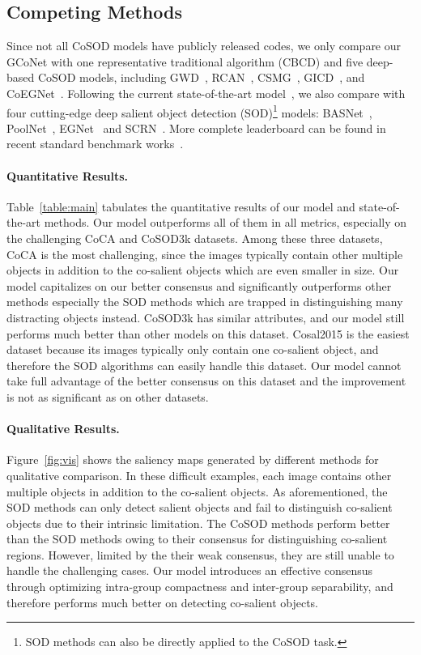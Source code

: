 \documentclass[final]{cvpr}
\def\ourmodel{GCoNet}
\begin{document}
\subsection{Competing Methods}
Since not all CoSOD models have publicly released codes, we only compare our {\ourmodel}  with one representative traditional algorithm (CBCD) and five deep-based CoSOD models, including GWD~\cite{li2019group}, RCAN~\cite{li2019detecting}, CSMG~\cite{zhang2019co}, GICD~\cite{zhang2020gradient}, and 
CoEGNet~\cite{deng2020re}. Following the current state-of-the-art model~\cite{zhang2020gradient}, we also compare with four cutting-edge deep salient object detection (SOD)\footnote{SOD methods can also be directly applied to the CoSOD task.} models: BASNet~\cite{qin2019basnet}, PoolNet~\cite{liu2019simple}, EGNet~\cite{zhao2019egnet} and SCRN~\cite{wu2019stacked}. More complete leaderboard can be found in recent standard benchmark works~\cite{deng2020re,fan2020taking}.






\paragraph{Quantitative Results.~}
Table~\ref{table:main}
tabulates the quantitative results of our model and state-of-the-art methods. Our model outperforms all of them in all metrics, especially on the challenging CoCA and CoSOD3k datasets. Among these three datasets, CoCA is the most challenging, since the images typically  contain other multiple  objects in addition to the co-salient objects which are even smaller in size. Our model capitalizes on our better consensus  
and significantly outperforms other methods especially  the SOD methods which are trapped in distinguishing many distracting objects instead. 
CoSOD3k has similar attributes, and our model still performs much better than other models on this dataset. Cosal2015 is the easiest dataset because its images typically only contain one co-salient object, and therefore the SOD algorithms can easily handle this dataset. Our model cannot take full advantage of the better consensus on this dataset and the improvement is not as significant as on other datasets.

\paragraph{Qualitative Results.~} Figure~\ref{fig:vis} shows the saliency maps generated by different methods for qualitative comparison. In these difficult examples, each image contains other multiple objects in addition to the co-salient objects. As aforementioned, the SOD methods can only detect  salient objects and fail to distinguish co-salient objects due to their intrinsic limitation. The CoSOD methods perform better than the SOD methods owing to their consensus for distinguishing co-salient regions. However, limited by the their weak consensus, they are still unable to  handle the challenging cases. Our model introduces an effective consensus  through optimizing intra-group compactness and inter-group separability, and therefore performs much better on detecting co-salient objects.
\end{document}
